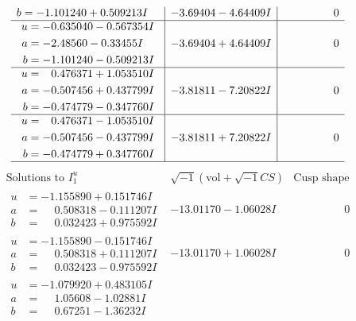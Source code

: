 \documentclass[1p]{elsarticle_modified}
\theoremstyle{definition}
\newcommand{\I}{\sqrt{-1}}
\begin{document}
$$\begin{array}{c|c|c}
\begin{aligned}
b &= -1.101240 + 0.509213 I\end{aligned}
 & -3.69404 - 4.64409 I & \phantom{-0.000000 } 0 \\ \hline\begin{aligned}
u &= -0.635040 - 0.567354 I \\
a &= -2.48560 - 0.33455 I \\
b &= -1.101240 - 0.509213 I\end{aligned}
 & -3.69404 + 4.64409 I & \phantom{-0.000000 } 0 \\ \hline\begin{aligned}
u &= \phantom{-}0.476371 + 1.053510 I \\
a &= -0.507456 + 0.437799 I \\
b &= -0.474779 - 0.347760 I\end{aligned}
 & -3.81811 - 7.20822 I & \phantom{-0.000000 } 0 \\ \hline\begin{aligned}
u &= \phantom{-}0.476371 - 1.053510 I \\
a &= -0.507456 - 0.437799 I \\
b &= -0.474779 + 0.347760 I\end{aligned}
 & -3.81811 + 7.20822 I & \phantom{-0.000000 } 0\\
 \hline 
 \end{array}$$\newpage$$\begin{array}{c|c|c}  
\text{Solutions to }I^u_{1}& \I (\text{vol} + \sqrt{-1}CS) & \text{Cusp shape}\\
 \hline 
\begin{aligned}
u &= -1.155890 + 0.151746 I \\
a &= \phantom{-}0.508318 - 0.111207 I \\
b &= \phantom{-}0.032423 + 0.975592 I\end{aligned}
 & -13.01170 - 1.06028 I & \phantom{-0.000000 } 0 \\ \hline\begin{aligned}
u &= -1.155890 - 0.151746 I \\
a &= \phantom{-}0.508318 + 0.111207 I \\
b &= \phantom{-}0.032423 - 0.975592 I\end{aligned}
 & -13.01170 + 1.06028 I & \phantom{-0.000000 } 0 \\ \hline\begin{aligned}
u &= -1.079920 + 0.483105 I \\
a &= \phantom{-}1.05608 - 1.02881 I \\
b &= \phantom{-}0.67251 - 1.36232 I\end{aligned}

\end{array}$$
\end{document}
